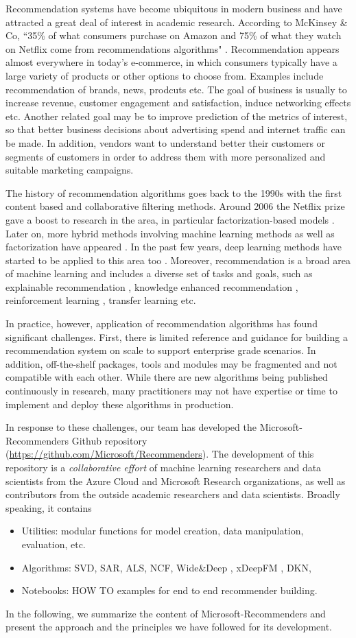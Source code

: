 Recommendation systems have become ubiquitous in modern business and have attracted a great deal of interest in academic research.
According to McKinsey \& Co,
“35\% of what consumers purchase on Amazon and 75\% of what they watch on Netflix come from recommendations algorithms" 
\cite{mckinsey}.
Recommendation appears almost everywhere in today's e-commerce, in which consumers typically have a large variety of products or other
options to choose from. Examples include recommendation of brands, news, prodcuts etc. The goal of business is usually to increase revenue,
customer engagement and satisfaction, induce networking effects etc. Another related goal may be to improve prediction of the metrics of interest, 
so that better business decisions about advertising spend and internet traffic can be made. In addition, vendors want to understand better their customers
or segments of customers in order to address them with more personalized and suitable marketing campaigns.

The history of recommendation algorithms goes back to the 1990s \cite{Tapestry, GroupLens}
with the first content based and collaborative filtering methods.
Around 2006 the Netflix prize \cite{} gave a boost to research in the area, in particular 
factorization-based models \cite{Koren,SVD++,PMF}.
Later on, more hybrid methods involving machine learning methods as well as factorization have appeared
\cite{FM,pairwise}.
In the past few years, deep learning methods have started to be applied to this area too
\cite{PNN,WideDeep,DeepFM,xDeepFM,NCF}.
Moreover, recommendation is a broad area of machine learning and includes a diverse set of tasks and goals, such as 
explainable recommendation \cite{}, knowledge enhanced recommendation \cite{},
reinforcement learning \cite{}, transfer learning \cite{} etc.

In practice, however, application of recommendation algorithms has found significant challenges. 
First, there is limited reference and guidance for building a recommendation system on scale to support
enterprise grade scenarios. In addition, off-the-shelf packages, tools and modules may be fragmented and not compatible with
each other. While there are new algorithms being published continuously in research, many practitioners may not have 
expertise or time to implement and deploy these algorithms in production.

In response to these challenges, our team has developed the Microsoft-Recommenders
Github repository (\url{https://github.com/Microsoft/Recommenders}).
The development of this repository is a {\em collaborative effort} of machine learning researchers and data scientists from the 
Azure Cloud and Microsoft Research organizations, as well as contributors from the outside academic researchers and data scientists.
Broadly speaking, it contains 
\begin{itemize}
\item
Utilities: modular functions for model creation, data manipulation, evaluation, etc.
\item
Algorithms: SVD, SAR, ALS, NCF, Wide\&Deep , xDeepFM , DKN,
\item
Notebooks: HOW TO examples for end to end recommender building.
\end{itemize}

In the following, we summarize the content of Microsoft-Recommenders and present the approach and the principles we have followed
for its development.
